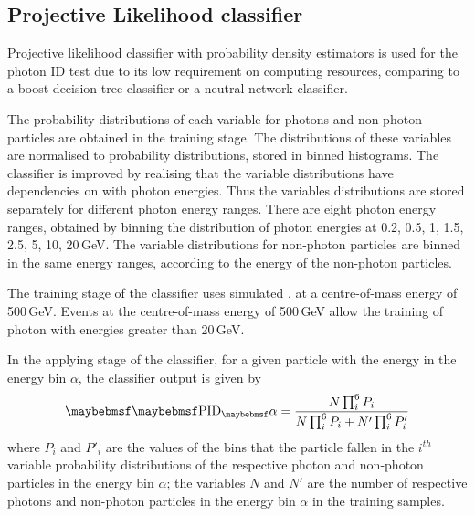 
\subsection{Projective Likelihood classifier}


Projective likelihood classifier  with probability density estimators is used  for the photon ID test due to its  low requirement on computing resources, comparing to a boost decision tree classifier or a neutral network classifier.

The probability distributions of each variable for photons and non-photon particles are obtained in the training stage. The distributions of these variables are normalised to probability distributions, stored in binned histograms. The classifier is improved by realising that the variable distributions have dependencies on with photon energies. Thus the variables distributions are stored separately for different photon energy ranges. There are eight photon energy ranges, obtained by binning the distribution of photon energies at 0.2, 0.5, 1, 1.5, 2.5, 5, 10, 20\,GeV. The variable distributions for non-photon particles are binned in the same energy ranges, according to the energy of the non-photon particles.

The training stage of the classifier uses simulated  \eeZuds, at a centre-of-mass energy of 500\,GeV. Events at the centre-of-mass energy of 500\,GeV allow the training of photon with energies greater than 20\,GeV.


In the applying stage of the classifier, for a given particle with the energy in the  energy bin $\alpha$, the classifier output is given by
\begin{equation}
\uprightMath{PID_\alpha} = \frac{N \prod_{i}^6{P_{i}}}{N \prod_{i}^6{P_{i}} + N' \prod_{i}^6{P'_{i}}}
\end{equation}
where $P_{i}$ and $P'_{i}$ are the values of the bins that the particle fallen in the $i^{th}$ variable probability distributions  of the  respective photon and non-photon particles in the energy bin $\alpha$; the variables $N$ and $N'$ are the number of respective photons and non-photon particles in the energy bin $\alpha$ in the training samples.


